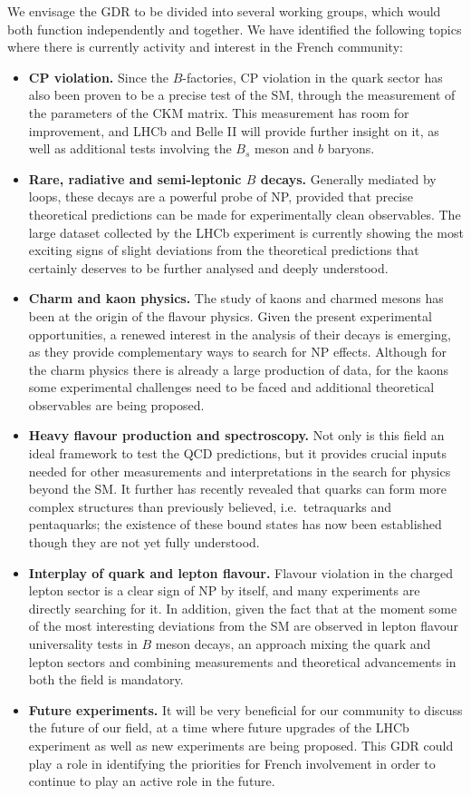 We envisage the GDR to be divided into several working groups, which would both function independently and together. We have identified the following topics where there is currently activity and interest in the French community:
\begin{itemize}
\item {\bf CP violation.}  Since the $B$-factories, CP violation in the quark sector has also been proven to be a precise test of the SM, through the measurement of the parameters of the CKM matrix. This measurement has room for improvement, and LHCb and Belle II will provide further insight on it, as well as additional tests involving the  $B_s$ meson and $b$ baryons. 
\item {\bf Rare, radiative and semi-leptonic $B$ decays.} Generally mediated by loops, these decays are a powerful probe of NP, provided that precise theoretical predictions can be made for experimentally clean observables. The large dataset collected by the LHCb experiment is currently showing the most exciting signs of slight deviations from the theoretical predictions that certainly deserves to be further analysed and deeply understood. 
\item {\bf Charm and kaon physics.} The study of kaons and charmed mesons has been at the origin of the flavour physics. Given the present experimental opportunities, a renewed interest in the analysis of their decays is emerging, as they provide complementary ways to search for NP effects.   Although for the charm physics there is already a large production of data, for the kaons some experimental challenges need to be faced and additional theoretical observables are being proposed.   
\item {\bf Heavy flavour production and spectroscopy.} Not only is this field an ideal framework to test the QCD predictions, but it provides crucial inputs needed for other measurements and interpretations in the search for physics beyond the SM.  It further has recently revealed that quarks can form more complex structures than previously believed, i.e.~tetraquarks and pentaquarks; the existence of these bound states has now been established though they are not yet fully understood.  
\item {\bf Interplay of quark and lepton  flavour. } Flavour violation in the charged lepton sector is a clear sign of NP by itself, and many experiments are directly searching for it. In addition, given the fact that at the moment some of the most interesting deviations from the SM are observed in  lepton flavour universality tests in $B$ meson decays, an approach mixing the quark and lepton sectors and combining measurements and theoretical advancements in both the field is mandatory. 
\item {\bf Future experiments.} It will be very beneficial for our community to discuss the future of our field, at a time where future upgrades of the LHCb experiment as well as new experiments are being proposed. This GDR could play a role in identifying the priorities for French involvement in order to continue to play an active role in the future. 
\end{itemize}
